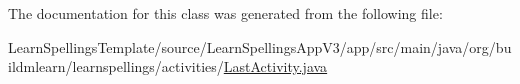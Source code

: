 The documentation for this class was generated from the following file\+:\begin{DoxyCompactItemize}
\item 
Learn\+Spellings\+Template/source/\+Learn\+Spellings\+App\+V3/app/src/main/java/org/buildmlearn/learnspellings/activities/\hyperlink{LearnSpellingsTemplate_2source_2LearnSpellingsAppV3_2app_2src_2main_2java_2org_2buildmlearn_2leaf6fc24ec35619a9a33c98a076823a3a6}{Last\+Activity.\+java}\end{DoxyCompactItemize}
